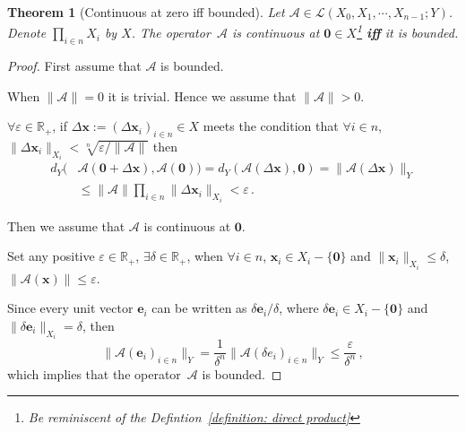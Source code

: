 \documentclass[openany]{book}
\theoremstyle{plain}
\newtheorem{theorem}{Theorem}[section] %
\theoremstyle{definition}
\newcommand*{\bv}{\boldsymbol} %
\newcommand{\emphbf}[1]{\emph{\textbf{#1}}}
\begin{document}
\begin{theorem}[Continuous at zero iff bounded]\label{theorem: continuous at zero iff bounded}
	Let $\mathscr A \in \mathcal L(X_0, X_1, \cdots, X_{n - 1}; Y)$.
	Denote $\prod_{i \in n} X_i$ by $X$.
	The operator~$\mathscr A$ is continuous at $\bv 0 \in X$\footnote{Be reminiscent of the Defintion~\ref{definition: direct product}} \emphbf{iff} it is bounded.
\end{theorem}
\begin{proof}
	First assume that $\mathscr A$ is bounded. 

	When $\|\mathscr A\| = 0$ it is trivial. 
	Hence we assume that $\|\mathscr A\| > 0$.
	
	$\forall \varepsilon \in \mathbb R_+$, if $\Delta \bv x := (\Delta \bv x_i)_{i \in n} \in X$ meets the condition that $\forall i \in n$, $\|\Delta \bv x_i\|_{X_i} < \sqrt[n]{\varepsilon / \|\mathscr A\|}$ then
	\begin{align*}
		d_Y(&\mathscr A(\bv 0 + \Delta \bv x), \mathscr A(\bv 0))
		= d_Y(\mathscr A(\Delta \bv x), \bv 0)
		= \|\mathscr A(\Delta \bv x)\|_Y
		\\
		&\leq \|\mathscr A\| \prod_{i \in n} \|\Delta \bv x_i\|_{X_i}
		< \varepsilon \,.
	\end{align*}

	Then we assume that $\mathscr A$ is continuous at $\bv 0$.

	Set any positive $\varepsilon \in \mathbb R_+$, $\exists \delta \in \mathbb R_+$, when $\forall i \in n$, $\bv x_i \in X_i - \{\bv 0\}$ and $\|\bv x_i\|_{X_i} \leq \delta$, $\|\mathscr A(\bv x)\| \leq \varepsilon$. 

	Since every unit vector $\bv e_i$ can be written as $\delta \bv e_i / \delta$, where $\delta \bv e_i \in X_i - \{\bv 0\}$ and $\|\delta \bv e_i\|_{X_i} = \delta$, then
	\begin{equation*}
		\|\mathscr A(\bv e_i)_{i \in n}\|_Y 
		= \frac 1 {\delta^n} \|\mathscr A(\delta e_i)_{i \in n}\|_Y
		\leq \frac \varepsilon {\delta^n}\,,
	\end{equation*}
	which implies that the operator~$\mathscr A$ is bounded.
\end{proof}
\end{document}
